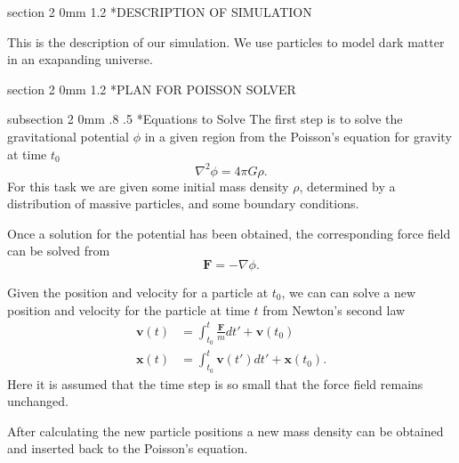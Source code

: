 \documentclass[titlepage, 11pt]{article}
\makeatletter
\renewcommand{\section}{\@startsection
        {section}
        {2}
        {0mm}
        {1.2\baselineskip}
        {\baselineskip}
        {\centering\normalsize}}
\renewcommand{\subsection}{\@startsection
        {subsection}
        {2}
        {0mm}
        {.8\baselineskip}
        {.5\baselineskip}
        {\bfseries\normalsize}}
\makeatother
\begin{document}


%

\section*{DESCRIPTION OF SIMULATION}

This is the description of our simulation. We use particles to model dark
matter in an exapanding universe.

\section*{PLAN FOR POISSON SOLVER}

\subsection*{Equations to Solve}
The first step is to solve the gravitational potential $\phi$ in a given region 
from the Poisson's equation for gravity at time $t_0$
\begin{equation}
\nabla^2 \phi = 4\pi G\rho. 
\end{equation}
For this task we are given some initial mass density $\rho$, determined by a 
distribution of massive particles, and some boundary conditions.

Once a solution for the potential has been obtained, the corresponding force
field can be solved from 
\begin{equation}
\mathbf{F} = -\nabla \phi.
\end{equation}

Given the position and velocity for a particle at $t_0$, we can can solve a 
new position and velocity for the particle at time $t$ from Newton's second law
\begin{align}
\mathbf{v}(t) &= \int_{t_0}^{t}\frac{\mathbf{F}}{m}dt' + \mathbf{v}(t_0)\\
\mathbf{x}(t) &= \int_{t_0}^{t}\mathbf{v}(t')dt' + \mathbf{x}(t_0).
\end{align}
Here it is assumed that the time step is so small that the force field remains 
unchanged.

After calculating the new particle positions a new mass density can be
obtained and inserted back to the Poisson's equation.
\end{document}
